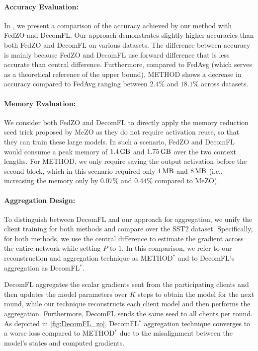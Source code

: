 \paragraph{Accuracy Evaluation:}

In , we present a comparison of the accuracy achieved by our method with FedZO and DecomFL. Our approach demonstrates slightly higher accuracies than both FedZO and DecomFL on various datasets. The difference between accuracy is mainly because FedZO and DecomFL use forward difference that is less accurate than central difference.  Furthermore, compared to FedAvg (which serves as a theoretical reference of the upper bound), \ac{METHOD} shows a decrease in accuracy compared to FedAvg ranging between $2.4\%$ and $18.1\%$ across datasets.



\paragraph{Memory Evaluation:}

We consider both FedZO and DecomFL to directly apply the memory reduction seed trick proposed by MeZO \cite{malladi2023fine} as they do not require activation reuse, so that they can train these large models. In such a scenario, FedZO and DecomFL would consume a peak memory of $\SI{1.4}{\giga \byte}$ and $\SI{1.75}{\giga \byte}$ over the two context lengths. For \ac{METHOD}, we only require saving the output activation before the second block, which in this scenario required only $\SI{1}{\mega \byte}$ and $\SI{8}{\mega \byte}$ (i.e., increasing the memory only by $0.07\%$ and $0.44\%$ compared to MeZO). 
 


    
\paragraph{Aggregation Design:}
\label{subsec:round_design}
To distinguish between DecomFL and our approach for aggregation, we unify the client training for both methods and compare over the SST2 dataset. Specifically, for both methods, we use the central difference to estimate the gradient across the entire network while setting $P$ to $1$. In this comparison, we refer to our reconstruction and aggregation technique as \ac{METHOD}$^*$ and to DecomFL's aggregation as DecomFL$^*$.

DecomFL aggregates the scalar gradients sent from the participating clients and then updates the model parameters over $K$ steps to obtain the model for the next round, while our technique reconstructs each client model and then performs the aggregation. Furthermore, DecomFL sends the same seed to all clients per round. As depicted in \cref{fig:DecomFL_zo}, DecomFL$^*$ aggregation technique converges to a worse loss compared to \ac{METHOD}$^*$ due to the misalignment between the model's states and computed gradients.


